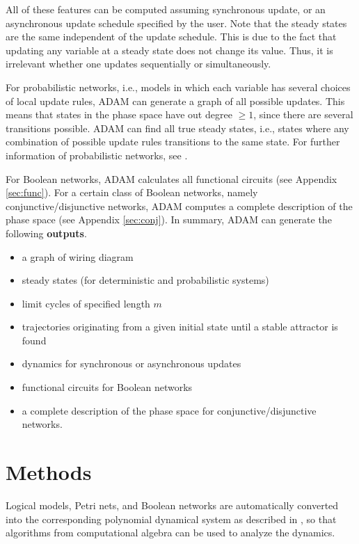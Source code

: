 \documentclass[10pt]{bmc_article}
\begin{document}
All of these features can be computed assuming synchronous update, or an asynchronous update schedule specified by the user. Note that the steady states are the same independent of the update schedule. This is due to the fact that updating any variable at a steady state does not change its value. Thus, it is irrelevant whether one updates sequentially or simultaneously.  

%
%

For probabilistic networks, i.e., models in which each variable has several choices of local update rules, ADAM can generate a graph of all possible updates. This means that states in the phase space have out degree $\geq 1$, since there are several transitions possible. ADAM can find all true  steady states, i.e., states where any combination of possible update rules transitions to the same state. For further information of probabilistic networks, see \cite{shmulevich}.

For Boolean networks, ADAM calculates all functional circuits (see Appendix \ref{sec:func}). For a certain class of Boolean networks, namely conjunctive/disjunctive networks, ADAM computes a complete description of the phase space (see Appendix \ref{sec:conj}).
In summary, ADAM can generate the following {\bf outputs}.
\begin{itemize}
\item a graph of wiring diagram
\item steady states (for deterministic and probabilistic systems)
\item limit cycles of specified length $m$
\item trajectories originating from a given initial state until a stable
attractor is found
\item dynamics for synchronous or asynchronous updates
\item functional circuits for Boolean networks
\item a complete description of the phase space for conjunctive/disjunctive
networks.
\end{itemize}
\section{Methods}
Logical models, Petri nets, and Boolean networks are automatically converted
into the corresponding polynomial dynamical system as described in
\cite{Alan:Bioinf2010}, so that algorithms from computational
algebra can be used to analyze the dynamics.
\end{document}
